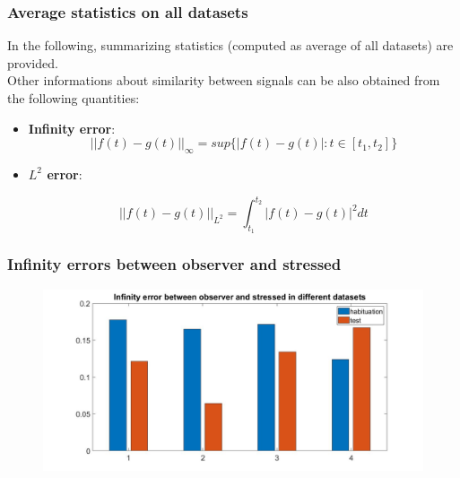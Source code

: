 \documentclass{beamer}
\begin{document}
\begin{frame}
\frametitle{Average statistics on all datasets}

In the following, summarizing statistics (computed as average of all datasets) are provided.\\
Other informations about similarity between signals can be also obtained from the following quantities:
\vspace{1 cm}
\begin{itemize}
	\item \textbf{Infinity error}:
	$$||f(t) - g(t)||_\infty = sup\{ |f(t)-g(t)| : t \in [t_1,t_2]\}$$
	
	\item \textbf{$L^2$ error}:
	
	$$||f(t) - g(t)||_{L^2} = \int_{t_1}^{t_2}|f(t)-g(t)|^2 dt$$
	

\end{itemize}
\end{frame}


\begin{frame}
\frametitle{Infinity errors between observer and stressed}



\begin{figure}[H]
	\begin{center}
		\hspace*{-1.7cm}
		\includegraphics[scale=.32]{inf_err_stress.jpg} 
	\end{center}  
	
	
\end{figure}

\end{frame}
\end{document}
